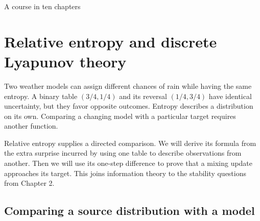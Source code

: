 \documentclass[11pt,oneside,openany]{book}
\theoremstyle{definition}
\theoremstyle{remark}
\numberwithin{equation}{chapter}
\begin{document}
\begin{titlepage}\color{ink}\centering\vspace*{1.0in}{\small\sffamily PROBABILITY AND MATHEMATICAL MODELLING\par}\vspace{.45in}{\Huge\bfseries Discrete Information\\[.12in]Geometry\par}\vspace{.35in}{\Large Finite Differences, Probability,\\and Information Flows\par}\vspace{1cm}{\Large Chapter 6\par}\vfill{}\vfill{\large A course in ten chapters\par}\end{titlepage}
\setcounter{chapter}{5}

\chapter{Relative entropy and discrete Lyapunov theory}
Two weather models can assign different chances of rain while having the same entropy. A binary table \((3/4,1/4)\) and its reversal \((1/4,3/4)\) have identical uncertainty, but they favor opposite outcomes. Entropy describes a distribution on its own. Comparing a changing model with a particular target requires another function.

Relative entropy supplies a directed comparison. We will derive its formula from the extra surprise incurred by using one table to describe observations from another. Then we will use its one-step difference to prove that a mixing update approaches its target. This joins information theory to the stability questions from Chapter 2.

\section{Comparing a source distribution with a model}\label{ch06-comparing-a-source-distribution-with-a-model}
\end{document}
